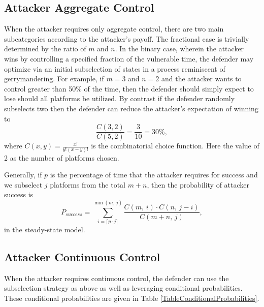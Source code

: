 \documentclass{acm_proc_article-sp}
\begin{document}
\subsection{Attacker Aggregate Control}

When the attacker requires only aggregate control, there are two main subcategories according to the
attacker's payoff.  The fractional case is trivially determined by the ratio of $m$ and $n$. In the binary case, wherein
the attacker wins by controlling a specified fraction of the vulnerable time, the defender may optimize via an initial
subselection of states in a process reminiscent of gerrymandering. For example, if $m=3$ and $n=2$ and the attacker wants
to control greater than 50\% of the time, then the defender should simply expect to lose should all platforms be
utilized. By contrast if the defender randomly subselects two then the defender can reduce the attacker's expectation of
winning to
\[
\frac{C\left(3,2\right)}{C\left(5,2\right)}=\frac{3}{10}=30\%,
\]
where $C\left(x,y\right)=\frac{x!}{y!(x-y)!}$ is the combinatorial choice function. Here the value of 2 as the number of
platforms chosen.

Generally, if $p$ is the percentage of time that the attacker requires for success and we subselect $j$ platforms from the total $m+n$,
then the probability of attacker success is
\[
P_{success}=\sum_{i=\lceil p\cdot j\rceil}^{\min\left(m,\, j\right)}\frac{C\left(m,\, i\right)\cdot C\left(n,\, j-i\right)}{C\left(m+n,\, j\right)},
\]
in the steady-state model.


\subsection{Attacker Continuous Control}

When the attacker requires continuous control, the defender can use the subselection strategy as above as well as
leveraging conditional probabilities. These conditional probabilities are given in Table
\ref{TableConditionalProbabilities}.
\end{document}

